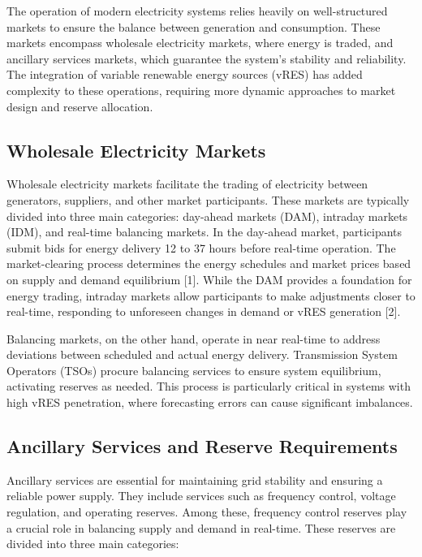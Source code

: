 The operation of modern electricity systems relies heavily on well-structured markets to ensure the balance between generation and consumption. These markets encompass wholesale electricity markets, where energy is traded, and ancillary services markets, which guarantee the system’s stability and reliability. The integration of variable renewable energy sources (vRES) has added complexity to these operations, requiring more dynamic approaches to market design and reserve allocation.

\subsection{Wholesale Electricity Markets}

Wholesale electricity markets facilitate the trading of electricity between generators, suppliers, and other market participants. These markets are typically divided into three main categories: day-ahead markets (DAM), intraday markets (IDM), and real-time balancing markets. In the day-ahead market, participants submit bids for energy delivery 12 to 37 hours before real-time operation. The market-clearing process determines the energy schedules and market prices based on supply and demand equilibrium [1]. While the DAM provides a foundation for energy trading, intraday markets allow participants to make adjustments closer to real-time, responding to unforeseen changes in demand or vRES generation [2].

Balancing markets, on the other hand, operate in near real-time to address deviations between scheduled and actual energy delivery. Transmission System Operators (TSOs) procure balancing services to ensure system equilibrium, activating reserves as needed. This process is particularly critical in systems with high vRES penetration, where forecasting errors can cause significant imbalances.

\subsection{Ancillary Services and Reserve Requirements}

Ancillary services are essential for maintaining grid stability and ensuring a reliable power supply. They include services such as frequency control, voltage regulation, and operating reserves. Among these, frequency control reserves play a crucial role in balancing supply and demand in real-time. These reserves are divided into three main categories:

